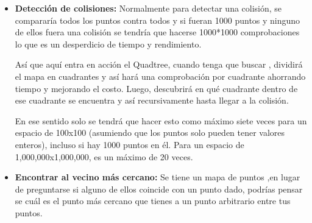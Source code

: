 \begin{itemize}
    \item \textbf{Detección de colisiones:} Normalmente para detectar una colisión, se   compararía todos los puntos contra todos y si  fueran  1000 puntos y ninguno de ellos fuera una colisión se tendría que hacerse 1000*1000 comprobaciones lo que es un desperdicio de tiempo y rendimiento.
 
   Así que aquí entra en acción el  Quadtree, cuando tenga que buscar , dividirá el mapa en cuadrantes y así hará una comprobación por cuadrante ahorrando tiempo y mejorando el costo. Luego, descubrirá en qué cuadrante dentro de ese cuadrante se encuentra y así recursivamente hasta llegar a la colisión.

    En ese sentido solo se tendrá que hacer esto como máximo siete veces para un espacio de 100x100 (asumiendo que los puntos solo pueden tener valores enteros), incluso si hay 1000 puntos en él. Para un espacio de 1,000,000x1,000,000, es un máximo de 20 veces.
        \item\textbf{ Encontrar al vecino más cercano:} Se tiene un mapa de puntos ,en lugar de preguntarse si alguno de ellos coincide con un punto dado, podrías pensar se cuál es el punto más cercano que tienes a un punto arbitrario entre tus puntos.


                    
\end{itemize}

